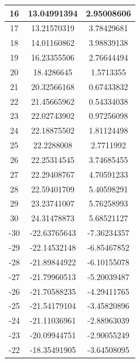 \begin{longtable}{|c|c|c|}
                16 & 13.04991394 & 2.95008606 \\
                \hline
                17 & 13.21570319 & 3.78429681 \\
                \hline
                18 & 14.01160862 & 3.98839138 \\
                \hline
                19 & 16.23355506 & 2.76644494 \\
                \hline
                20 & 18.4286645 & 1.5713355 \\
                \hline
                21 & 20.32566168 & 0.67433832 \\
                \hline
                22 & 21.45665962 & 0.54334038 \\
                \hline
                23 & 22.02743902 & 0.97256098 \\
                \hline
                24 & 22.18875502 & 1.81124498 \\
                \hline
                25 & 22.2288008 & 2.7711992 \\
                \hline
                26 & 22.25314545 & 3.74685455 \\
                \hline
                27 & 22.29408767 & 4.70591233 \\
                \hline
                28 & 22.59401709 & 5.40598291 \\
                \hline
                29 & 23.23741007 & 5.76258993 \\
                \hline
                30 & 24.31478873 & 5.68521127 \\
                \hline
                -30 & -22.63765643 & -7.36234357 \\
                \hline
                -29 & -22.14532148 & -6.85467852 \\
                \hline
                -28 & -21.89844922 & -6.10155078 \\
                \hline
                -27 & -21.79960513 & -5.20039487 \\
                \hline
                -26 & -21.70588235 & -4.29411765 \\
                \hline
                -25 & -21.54179104 & -3.45820896 \\
                \hline
                -24 & -21.11036961 & -2.88963039 \\
                \hline
                -23 & -20.09944751 & -2.90055249 \\
                \hline
                -22 & -18.35491905 & -3.64508095 \\

\end{longtable}
